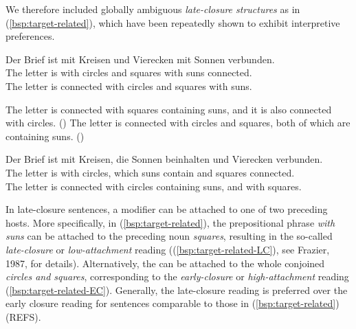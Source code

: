 \documentclass[fleqn,reqno,10pt,draft]{article}
\newcommand{\lc}{\acro{lc}}
\newcommand{\ec}{\acro{ec}}
\begin{document}
We therefore included globally ambiguous \emph{late-closure
  structures} as in (\ref{bsp:target-related}), which have been
repeatedly shown to exhibit interpretive preferences.
\begin{exe}
\ex \gll Der Brief ist mit Kreisen und Vierecken mit Sonnen
  verbunden. \label{bsp:target-related}\\
The letter is with circles and squares with suns connected.\\
The letter is connected with circles and squares with suns.
\begin{xlist}
  \ex \label{bsp:target-related-LC} The letter is connected with squares containing suns, and it is
    also connected with circles. \hfill{(\lc)}
  \ex \label{bsp:target-related-EC} The letter is connected with circles and squares, both of which
    are containing suns.  \hfill{(\ec)} 
\end{xlist}

\ex \gll Der Brief ist mit Kreisen, die Sonnen beinhalten und Vierecken
  verbunden. \label{bsp:target-related2}\\
The letter is with circles, which suns contain and squares connected.\\
The letter is connected with circles containing suns, and with squares.

\end{exe}
In late-closure sentences, a modifier can be attached to one of two
preceding hosts. More specifically, in (\ref{bsp:target-related}), the
prepositional phrase \emph{with suns} can be attached to the preceding
noun \emph{squares}, resulting in the so-called \emph{late-closure} or
\emph{low-attachment} reading ((\ref{bsp:target-related-LC}), see
Frazier, 1987, for details). Alternatively, the
 can be attached to the whole conjoined 
\emph{circles and squares}, corresponding to the \emph{early-closure}
or \emph{high-attachment} reading
(\ref{bsp:target-related-EC}). Generally, the late-closure reading is
preferred over the early closure reading for sentences comparable to
those in (\ref{bsp:target-related}) (REFS).
\end{document}

